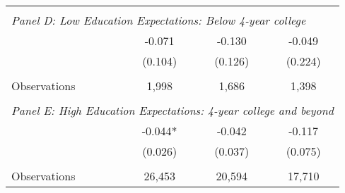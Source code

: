 {\begin{tabular}{lccc}
&  &  &   \\
\multicolumn{4}{l}{\textit{Panel D: Low Education Expectations: Below 4-year college}} \\
\hspace{3mm}        &      -0.071   &      -0.130   &      -0.049   \\
                    &     (0.104)   &     (0.126)   &     (0.224)   \\
                    &               &               &               \\
\hspace{3mm}Observations&       1,998   &       1,686   &       1,398   \\
 
&  &  &   \\
\multicolumn{4}{l}{\textit{Panel E: High Education Expectations: 4-year college and beyond}} \\
\hspace{3mm}        &      -0.044*  &      -0.042   &      -0.117   \\
                    &     (0.026)   &     (0.037)   &     (0.075)   \\
                    &               &               &               \\
\hspace{3mm}Observations&      26,453   &      20,594   &      17,710   \\
 

\bottomrule
\end{tabular}
}
